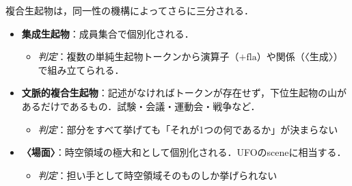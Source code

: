 \documentclass[../../main-detail.tex]{subfiles}
\begin{document}
複合生起物は，同一性の機構によってさらに三分される．
\begin{itemize}
    \item \textbf{集成生起物}：成員集合で個別化される．
    \begin{itemize}
        \item \emph{判定}：複数の単純生起物トークンから演算子（$+\text{fla}$）や関係（〈生成〉）で組み立てられる．
    \end{itemize}
    \item \textbf{文脈的複合生起物}：記述がなければトークンが存在せず，下位生起物の山があるだけであるもの．試験・会議・運動会・戦争など．
    \begin{itemize}
        \item \emph{判定}：部分をすべて挙げても「それが1つの何であるか」が決まらない
    \end{itemize}
    \item \textbf{〈場面〉}：時空領域の極大和として個別化される．UFOのsceneに相当する．
    \begin{itemize}
        \item \emph{判定}：担い手として時空領域そのものしか挙げられない
    \end{itemize}
\end{itemize}
\end{document}
